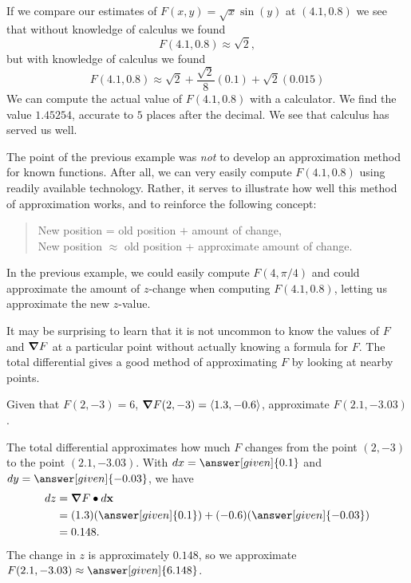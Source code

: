 \documentclass{ximera}
\begin{document}
\begin{remark}
  If we compare our estimates of $F(x,y) = \sqrt{x}\sin(y)$ at
  $(4.1,0.8)$ we see that without knowledge of calculus we found
  \[
  F(4.1,0.8) \approx \sqrt{2},
  \]
  but with knowledge of calculus we found
  \[
  F(4.1,0.8) \approx \sqrt{2} + \frac{\sqrt{2}}8(0.1) + \sqrt{2}(0.015)
  \]
  We can compute the actual value of $F(4.1,0.8)$ with a calculator.
  We find the value $1.45254$, accurate to $5$ places after the
  decimal. We see that calculus has served us well.
\end{remark}

The point of the previous example was \textit{not} to develop an
approximation method for known functions. After all, we can very
easily compute $F(4.1,0.8)$ using readily available
technology. Rather, it serves to illustrate how well this method of
approximation works, and to reinforce the following concept:
\begin{quote}
  New position = old position $+$ amount of change, \\
  New position $\approx$ old position + approximate amount of change.
\end{quote}

In the previous example, we could easily compute $F(4,\pi/4)$ and
could approximate the amount of $z$-change when computing
$F(4.1,0.8)$, letting us approximate the new $z$-value.

It may be surprising to learn that it is not uncommon to know the
values of $F$ and $\boldsymbol\nabla F$ at a particular point without actually
knowing a formula for $F$. The total differential gives a good method
of approximating $F$ by looking at nearby points.

\begin{example}
  Given that $F(2,-3) = 6$, $\boldsymbol\nabla F(2,-3) = \left\langle 1.3,-0.6\right\rangle$,
  approximate $F(2.1,-3.03)$.
\begin{explanation}
  The total differential approximates how much $F$ changes from the
  point $(2,-3)$ to the point $(2.1,-3.03)$. With $\d x = \answer[given]{0.1}$ and $\d
  y = \answer[given]{-0.03}$, we have
  \begin{align*}
    \d z &= \grad F \dotp \d \vec{x}\\
    &= (1.3)(\answer[given]{0.1}) + (-0.6)(\answer[given]{-0.03}) \\
    &= 0.148.
  \end{align*}
  The change in $z$ is approximately $0.148$, so we approximate
  $F(2.1,-3.03)\approx \answer[given]{6.148}$.
\end{explanation}
\end{example}
\end{document}
